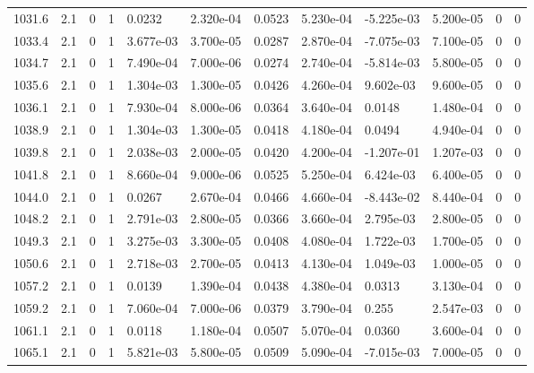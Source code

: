 \documentclass[preview]{standalone}
\begin{document}
{{{{{{{{{{{{{{{{{{{\begin{tabular}{L{1.2cm}C{1.2cm} C{0.3cm}C{0.5cm} C{1.4cm}C{1.4cm} C{1.4cm}C{1.4cm} C{1.6cm}C{1.6cm} C{1.6cm}C{1.6cm}}
  1031.6  &   2.1  & 0     &  1 &  0.0232  & 2.320e-04  &  0.0523&   5.230e-04& -5.225e-03 & 5.200e-05   &  0 & 0  \\ 
  1033.4  &   2.1  & 0     &  1 &  3.677e-03  & 3.700e-05  &  0.0287&   2.870e-04& -7.075e-03 & 7.100e-05   &  0 & 0  \\ 
  1034.7  &   2.1  & 0     &  1 &  7.490e-04  & 7.000e-06  &  0.0274&   2.740e-04& -5.814e-03 & 5.800e-05   &  0 & 0  \\ 
  1035.6  &   2.1  & 0     &  1 &  1.304e-03  & 1.300e-05  &  0.0426&   4.260e-04& 9.602e-03 & 9.600e-05   &  0 & 0  \\ 
  1036.1  &   2.1  & 0     &  1 &  7.930e-04  & 8.000e-06  &  0.0364&   3.640e-04& 0.0148 & 1.480e-04   &  0 & 0  \\ 
  1038.9  &   2.1  & 0     &  1 &  1.304e-03  & 1.300e-05  &  0.0418&   4.180e-04& 0.0494 & 4.940e-04   &  0 & 0  \\ 
  1039.8  &   2.1  & 0     &  1 &  2.038e-03  & 2.000e-05  &  0.0420&   4.200e-04& -1.207e-01 & 1.207e-03   &  0 & 0  \\ 
  1041.8  &   2.1  & 0     &  1 &  8.660e-04  & 9.000e-06  &  0.0525&   5.250e-04& 6.424e-03 & 6.400e-05   &  0 & 0  \\ 
  1044.0  &   2.1  & 0     &  1 &  0.0267  & 2.670e-04  &  0.0466&   4.660e-04& -8.443e-02 & 8.440e-04   &  0 & 0  \\ 
  1048.2  &   2.1  & 0     &  1 &  2.791e-03  & 2.800e-05  &  0.0366&   3.660e-04& 2.795e-03 & 2.800e-05   &  0 & 0  \\ 
  1049.3  &   2.1  & 0     &  1 &  3.275e-03  & 3.300e-05  &  0.0408&   4.080e-04& 1.722e-03 & 1.700e-05   &  0 & 0  \\ 
  1050.6  &   2.1  & 0     &  1 &  2.718e-03  & 2.700e-05  &  0.0413&   4.130e-04& 1.049e-03 & 1.000e-05   &  0 & 0  \\ 
  1057.2  &   2.1  & 0     &  1 &  0.0139  & 1.390e-04  &  0.0438&   4.380e-04& 0.0313 & 3.130e-04   &  0 & 0  \\ 
  1059.2  &   2.1  & 0     &  1 &  7.060e-04  & 7.000e-06  &  0.0379&   3.790e-04& 0.255 & 2.547e-03   &  0 & 0  \\ 
  1061.1  &   2.1  & 0     &  1 &  0.0118  & 1.180e-04  &  0.0507&   5.070e-04& 0.0360 & 3.600e-04   &  0 & 0  \\ 
  1065.1  &   2.1  & 0     &  1 &  5.821e-03  & 5.800e-05  &  0.0509&   5.090e-04& -7.015e-03 & 7.000e-05   &  0 & 0  \\ 
\hline 
\end{tabular} 

}}}}}}}}}}}}}}}}}}}
\end{document}

